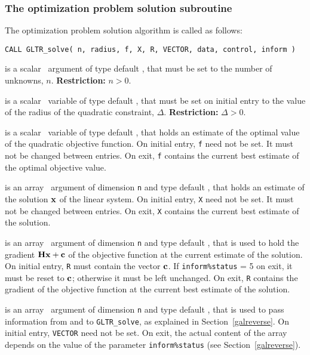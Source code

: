 \documentclass{galahad}
\newcommand{\packagename}{GL\-TR}
\begin{document}

\subsubsection{The optimization problem solution subroutine}
The optimization problem solution algorithm is called as follows:

\hskip0.5in
{\tt CALL \packagename\_solve( n, radius, f, X, R, VECTOR, data, control, inform )}

\begin{description}

 is a scalar \intentin\ argument of type default \integer, that must be
set to the number of unknowns, $n$. {\bf Restriction: } $n  >  0$.

 is a scalar \intentin\ variable of type default
\realdp,
that must be set on initial entry
to the value of the radius of the quadratic constraint, $\Delta$.
{\bf Restriction: } $\Delta > 0$.

 is a scalar \intentinout\ variable of type default
\realdp,
that holds an estimate of
the optimal value of the quadratic objective function.
On initial entry, {\tt f} need not be set.
It must not be changed between entries.
On exit, {\tt f} contains the current best estimate of the optimal objective
value.

 is an array \intentinout\ argument of dimension {\tt n} and
type default \realdp,
that holds an estimate of the solution ${\mathbf{x}}$ of the linear system.
On initial entry, {\tt X} need not be set.
It must not be changed between entries.
On exit, {\tt X} contains the current best estimate of the solution.

 is an array \intentinout\ argument of dimension {\tt n} and
type default \realdp,
that is used to hold the gradient ${\mathbf{H}} {\mathbf{x}}  +  {\mathbf{c}}$ of the objective
function at the current estimate of the solution.
On initial entry, {\tt R} must contain the vector ${\mathbf{c}}$.
If {\tt inform\%status} = 5 on exit, it must be reset to  ${\mathbf{c}}$; otherwise
it must be left unchanged. On exit, {\tt R} contains the gradient of the objective
function at the current best estimate of the solution.

 is an array \intentinout\ argument of dimension {\tt n}
and type default \realdp,
that is used to pass information from and to {\tt \packagename\_solve},
as explained in Section~\ref{galreverse}.
On initial entry, {\tt VECTOR} need not be set. On exit, the actual content of
the array depends on the value of the parameter {\tt inform\%status}
(see Section~\ref{galreverse}).


\end{description}
\end{document}
